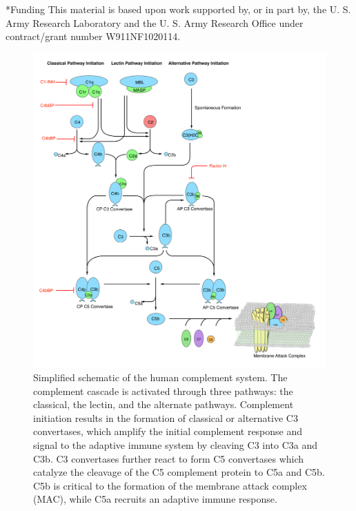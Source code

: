 \documentclass[12pt]{article}
\makeatletter
\renewcommand\section{\@startsection
	{subsection}{2}{0mm}
	{-0.2in}
	{0.05\baselineskip}
	{\normalfont\large\bfseries}}
\makeatother
\begin{document}
\section*{Funding}
This material is based upon work supported by, or in part by, the U. S. Army Research Laboratory and the U. S. Army Research Office under contract/grant number W911NF1020114.

\clearpage




\clearpage


\begin{figure}[ht]
\centering
\includegraphics[width=1.0\textwidth]{./figs/Fig1_Schematic_v2.pdf}
\caption{Simplified schematic of the human complement system. The complement cascade is activated through three pathways:  the classical, the lectin, and the alternate pathways.
Complement initiation results in the formation of classical or alternative C3 convertases, which amplify the initial complement response and signal to the adaptive immune system by cleaving C3 into C3a and C3b. C3 convertases further react to form C5 convertases which catalyze the cleavage of the C5 complement protein to C5a and C5b.
C5b is critical to the formation of the membrane attack complex (MAC), while C5a recruits an adaptive immune response.}\label{fig-schematic}
\end{figure}
\end{document}
